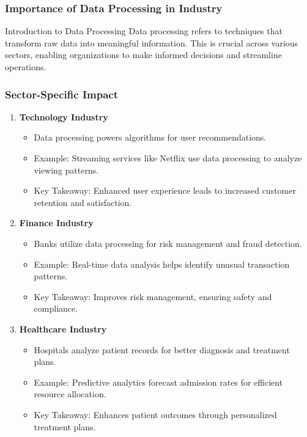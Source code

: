 \documentclass[aspectratio=169]{beamer}
\begin{document}
\begin{frame}[fragile]
    \frametitle{Importance of Data Processing in Industry}
    \begin{block}{Introduction to Data Processing}
        Data processing refers to techniques that transform raw data into meaningful information. This is crucial across various sectors, enabling organizations to make informed decisions and streamline operations.
    \end{block}
\end{frame}

\begin{frame}[fragile]
    \frametitle{Sector-Specific Impact}
    \begin{enumerate}
        \item \textbf{Technology Industry}
            \begin{itemize}
                \item Data processing powers algorithms for user recommendations.
                \item Example: Streaming services like Netflix use data processing to analyze viewing patterns.
                \item Key Takeaway: Enhanced user experience leads to increased customer retention and satisfaction.
            \end{itemize}
        \item \textbf{Finance Industry}
            \begin{itemize}
                \item Banks utilize data processing for risk management and fraud detection.
                \item Example: Real-time data analysis helps identify unusual transaction patterns.
                \item Key Takeaway: Improves risk management, ensuring safety and compliance.
            \end{itemize}
        \item \textbf{Healthcare Industry}
            \begin{itemize}
                \item Hospitals analyze patient records for better diagnosis and treatment plans.
                \item Example: Predictive analytics forecast admission rates for efficient resource allocation.
                \item Key Takeaway: Enhances patient outcomes through personalized treatment plans.
            \end{itemize}
    \end{enumerate}
\end{frame}
\end{document}
